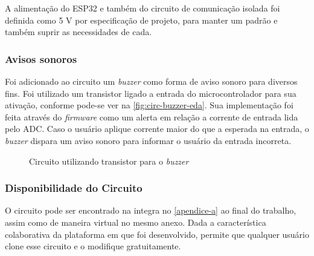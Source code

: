 A alimentação do ESP32 e também do circuito de comunicação isolada foi definida como 5 V por especificação de projeto, para manter um padrão e também suprir as necessidades de cada.

\subsubsection{Avisos sonoros}\label{aviso-sonoro}

Foi adicionado ao circuito um \textit{buzzer} como forma de aviso sonoro para diversos fins. Foi utilizado um transistor ligado a entrada do microcontrolador para sua ativação, conforme pode-se ver na \autoref{fig:circ-buzzer-eda}. Sua implementação foi feita através do \textit{firmware} como um alerta em relação a corrente de entrada lida pelo ADC. Caso o usuário aplique corrente maior do que a esperada na entrada, o \textit{buzzer} dispara um aviso sonoro para informar o usuário da entrada incorreta.

\begin{figure}[htb!]
    \caption{Circuito utilizando transistor para o \textit{buzzer}}
    \vspace*{5mm}
    \label{fig:circ-buzzer-eda}
    \fonte{}
\end{figure}

\subsubsection{Disponibilidade do Circuito}\label{availability}

O circuito pode ser encontrado na integra no \autoref{apendice-a} ao final do trabalho, assim como de maneira virtual no mesmo anexo. Dada a característica colaborativa da plataforma em que foi desenvolvido, permite que qualquer usuário clone esse circuito e o modifique gratuitamente.

